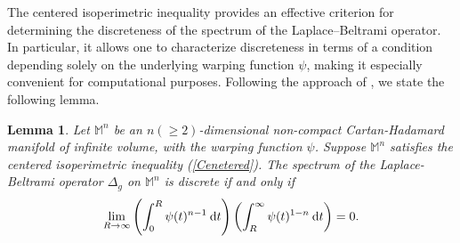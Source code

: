 \documentclass[a4paper,11pt,reqno]{amsart}
\renewcommand\eqref[1]{(\ref{#1})}
\theoremstyle{plain}
\newtheorem{lemma}{Lemma}[section]
\numberwithin{equation}{section} \allowdisplaybreaks
\newcommand{\lapg}{\Delta_{g}}
\newcommand{\m}{\mathbb{M}^n}
\newcommand{\dt}{\:{\rm d}t}
\begin{document}
The centered isoperimetric inequality provides an effective criterion for determining the discreteness of the spectrum of the Laplace–Beltrami operator. In particular, it allows one to characterize discreteness in terms of a condition depending solely on the underlying warping function $\psi$, making it especially convenient for computational purposes. Following the approach of \cite{CM}, we state the following lemma.
\begin{lemma}\label{discreteness}
    Let $\m$ be an $n(\geq 2)$-dimensional non-compact Cartan-Hadamard manifold of infinite volume, with the warping function $\psi$. Suppose $\m$ satisfies the centered isoperimetric inequality \eqref{Cenetered}. The spectrum of the Laplace-Beltrami operator $\lapg$ on $\m$ is discrete if and only if
    \begin{equation*}
        \lim_{R \to \infty}\left(\int_0^R \psi(t)^{n-1}\dt\right)\left(\int_R^{\infty}\psi(t)^{1-n}\dt\right)=0.
    \end{equation*}
\end{lemma}
\end{document}
